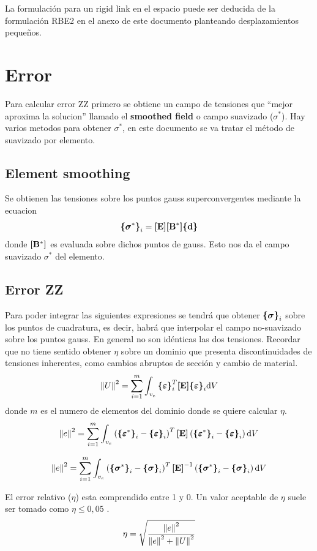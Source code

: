 La formulación para un rigid link en el espacio puede ser deducida de la formulación RBE2 en el anexo de este documento planteando desplazamientos pequeños.

\section{Error}

Para calcular error ZZ primero se obtiene un campo de tensiones que ``mejor aproxima la solucion''{} llamado el \textbf{smoothed field} o campo suavizado ($\sigma^*$). Hay varios metodos para obtener $\sigma^*$, en este documento se va tratar el método de suavizado por elemento.

\subsection*{Element smoothing}
Se obtienen las tensiones sobre los puntos gauss superconvergentes mediante la ecuacion
\[
 \boldsymbol{\{ }\mathbf{\boldsymbol{\sigma}^*} \boldsymbol{\}}_i = \boldsymbol{[}\mathbf{E} \boldsymbol{]} \boldsymbol{[}\mathbf{B^*} \boldsymbol{]} \boldsymbol{\{ }\mathbf{d} \boldsymbol{\}}
\]
donde $\boldsymbol{[}\mathbf{B^*} \boldsymbol{]}$ es evaluada sobre dichos puntos de gauss. Esto nos da el campo suavizado $\sigma^*$ del elemento. 

\subsection*{Error ZZ}
Para poder integrar las siguientes expresiones se tendrá que obtener $\boldsymbol{\{ }\mathbf{\boldsymbol{\sigma}} \boldsymbol{\}}_i$ sobre los puntos de cuadratura, es decir, habrá que interpolar el campo no-suavizado sobre los puntos gauss. En general no son idénticas las dos tensiones. Recordar que no tiene sentido obtener $\eta$ sobre un dominio que presenta discontinuidades de tensiones inherentes, como cambios abruptos de sección y cambio de material.
\[
\left\Vert U\right\Vert^2 = \sum^m_{i=1}\int_{v_e} \boldsymbol{\{ }\mathbf{\boldsymbol{\varepsilon}} \boldsymbol{\}}_i^T \boldsymbol{[}\mathbf{E} \boldsymbol{]} \boldsymbol{\{ }\mathbf{\boldsymbol{\varepsilon}} \boldsymbol{\}}_i \textrm{d} V
\]
donde $m$ es el numero de elementos del dominio donde se quiere calcular $\eta$.
\[
\left\Vert e\right\Vert^2=\sum_{i=1}^m \int_{v_e} \left( \boldsymbol{\{ }\mathbf{\boldsymbol{\varepsilon}^*} \boldsymbol{\}}_i - \boldsymbol{\{ }\mathbf{\boldsymbol{\varepsilon}} \boldsymbol{\}}_i\right)^T \boldsymbol{[}\mathbf{E} \boldsymbol{]} \left( \boldsymbol{\{ }\mathbf{\boldsymbol{\varepsilon}^*} \boldsymbol{\}}_i - \boldsymbol{\{ }\mathbf{\boldsymbol{\varepsilon}} \boldsymbol{\}}_i\right) \textrm{d} V
\]

\[
\left\Vert e\right\Vert^2=\sum_{i=1}^m \int_{v_e} \left( \boldsymbol{\{ }\mathbf{\boldsymbol{\sigma}^*} \boldsymbol{\}}_i - \boldsymbol{\{ }\mathbf{\boldsymbol{\sigma}} \boldsymbol{\}}_i\right)^T \boldsymbol{[}\mathbf{E} \boldsymbol{]} ^{-1} \left( \boldsymbol{\{ }\mathbf{\boldsymbol{\sigma}^*} \boldsymbol{\}}_i - \boldsymbol{\{ }\mathbf{\boldsymbol{\sigma}} \boldsymbol{\}}_i\right) \textrm{d} V
\]

El error relativo ($\eta$) esta comprendido entre 1 y 0. Un valor aceptable de $\eta$ suele ser tomado como $\eta\leq 0,05$ \citep{cook2007concepts}.
\[
\eta = \sqrt{\frac{\left\Vert e\right\Vert^2}{\left\Vert e\right\Vert^2+\left\Vert U\right\Vert^2}}
\]


